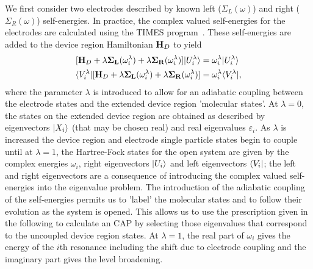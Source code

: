 We first consider two electrodes described by known left ($\Sigma_L(\omega)$)
and right ($\Sigma_R(\omega)$) self-energies. In practice, the complex valued
self-energies for the electrodes are calculated using the TIMES
program~\cite{times}. These self-energies are added to the device region
Hamiltonian $\mathbf{H}_D$ to yield
\begin{subequations}
\begin{align}
        [\mathbf{H}_D + \lambda \mathbf{\Sigma_L}(\omega_i^\lambda)
            +\lambda \mathbf{\Sigma_R}(\omega_i^\lambda)] |U_i^\lambda \rangle
        &= \omega_i^\lambda |U_i^\lambda \rangle \\
        \langle V_i^\lambda| [\mathbf{H}_D + \lambda \mathbf{\Sigma_L}(\omega_i^\lambda)
            +\lambda \mathbf{\Sigma_R}(\omega_i^\lambda)]
        &= \omega_i^\lambda \langle V_i^\lambda|,
        \label{eq:adiabaticap}
\end{align}
\end{subequations}
where the parameter $\lambda$ is introduced to allow for an adiabatic
coupling between the electrode states and the extended device region
'molecular states'.  At $\lambda = 0$, the states on the extended device
region are obtained as described by eigenvectors $|X_i \rangle$ (that may
be chosen real) and real eigenvalues $\varepsilon_i$. As $\lambda$ is
increased the device region and electrode single particle states begin
to couple until at $\lambda=1$, the Hartree-Fock states for the open
system are given by the complex energies $\omega_i$, right eigenvectors
$|U_i \rangle$ and left eigenvectors $\langle V_i|$; the left and right
eigenvectors are a consequence of introducing the complex valued
self-energies into the eigenvalue problem. The introduction of the
adiabatic coupling of the self-energies permits us to 'label' the
molecular states and to follow their evolution as the system is opened.
This allows us to use the prescription given in the following to
calculate an \ai \ac{CAP} by selecting those eigenvalues that correspond
to the uncoupled device region states. At $\lambda=1$, the real part of
$\omega_i$ gives the energy of the $i$th resonance including the shift due
to electrode coupling and the imaginary part gives the level broadening.

